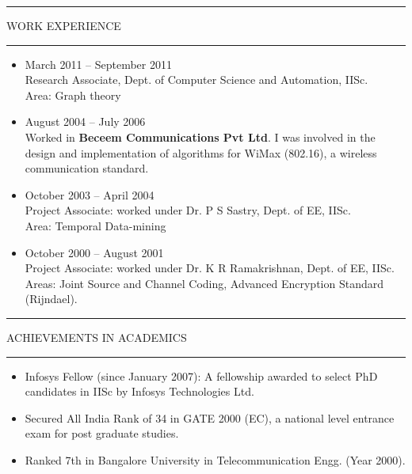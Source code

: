 \documentclass{article}
\begin{document}
\vspace{3mm}\hrule\vspace{-2mm}
\begin{center}
WORK EXPERIENCE \\
\end{center}
\vspace{-2mm}\hrule\vspace{2mm}
\begin{itemize}
\item
March 2011 -- September 2011\\
Research Associate, Dept. of Computer Science and Automation, IISc.\\
Area: Graph theory
\item
August 2004 -- July 2006\\
Worked in \textbf{Beceem Communications Pvt Ltd}. I was involved in the design and implementation of algorithms for
WiMax (802.16), a wireless communication standard. 
\item
October 2003 -- April 2004\\ 
Project Associate: worked under Dr. P S Sastry, Dept. of EE, IISc. \\ 
Area: Temporal Data-mining 
\item
October 2000 -- August 2001\\ 
Project Associate: worked under Dr. K R Ramakrishnan, Dept. of EE, IISc.\\  
Areas: Joint Source and Channel Coding,  Advanced Encryption Standard (Rijndael).
\end{itemize}
\vspace{2mm}\hrule\vspace{-2mm}
\begin{center}
ACHIEVEMENTS IN ACADEMICS\\
\end{center}
\vspace{-2mm}\hrule\vspace{2mm}
\begin{itemize}
\item Infosys Fellow (since January 2007): A fellowship awarded to select
PhD candidates in IISc by Infosys Technologies Ltd. 
\item Secured All India Rank of 34 in GATE 2000 (EC), a national level
entrance exam for post graduate studies.
\item Ranked 7th in Bangalore University in Telecommunication Engg. (Year 2000).
\end{itemize}
\end{document}
